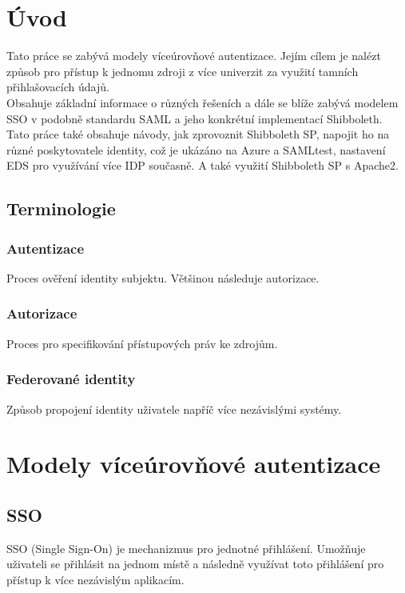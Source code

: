 \chapter{Úvod}
Tato práce se zabývá modely víceúrovňové autentizace. Jejím cílem je nalézt způsob pro přístup k jednomu zdroji z více univerzit za využití tamních přihlašovacích údajů.\\
Obsahuje základní informace o různých řešeních a dále se blíže zabývá modelem SSO v podobně standardu SAML a jeho konkrétní implementací Shibboleth.\\
Tato práce také obsahuje návody, jak zprovoznit Shibboleth SP, napojit ho na různé poskytovatele identity, což je ukázáno na Azure a SAMLtest, nastavení EDS pro využívání více IDP současně. A také využití Shibboleth SP s Apache2.\\


\section{Terminologie}
\subsection{Autentizace}
Proces ověření identity subjektu. Většinou následuje autorizace.\cite{Authorization}
\subsection{Autorizace}
Proces pro specifikování přístupových práv ke zdrojům.\cite{Autentizace}
 \subsection{Federované identity}
Způsob propojení identity uživatele napříč více nezávislými systémy. \cite{federatedIdentities}



\chapter{Modely víceúrovňové autentizace}
\section{SSO}
\label{sso}
SSO (Single Sign-On) je mechanizmus pro jednotné přihlášení. Umožňuje uživateli se přihlásit na jednom místě a následně využívat toto přihlášení pro přístup k více nezávislým aplikacím. \cite{SSO}

